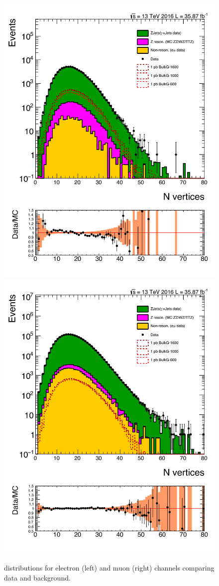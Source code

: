 \begin{figure}[htbp!]
\centering
\includegraphics[width=0.46\linewidth,page=16]{figures/ReMiniSummer16_DT_PhReMiniMCRcFixXsec_GMCPhPtWt_tightzpt50_puWeightsummer16_muoneg_gjet_metfilter_unblind_el_log_1pb.pdf}
\includegraphics[width=0.46\linewidth,page=16]{figures/ReMiniSummer16_DT_PhReMiniMCRcFixXsec_GMCPhPtWt_tightzpt50_puWeightsummer16_muoneg_gjet_metfilter_unblind_mu_log_1pb.pdf}
\caption{\ptmiss distributions for electron (left) and muon (right) channels
comparing data and background.}
\label{fig:gjet_met_wide}
\end{figure}

